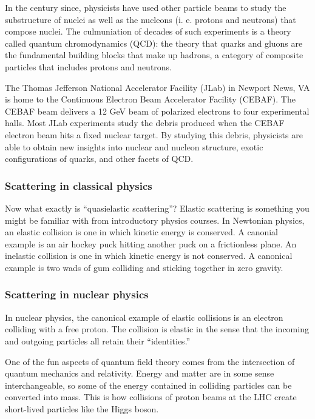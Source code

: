 In the century since, physicists have used other particle beams to study the
substructure of nuclei as well as the nucleons (i.  e.  protons and neutrons)
that compose nuclei.
The culmuniation of decades of such experiments is a theory called quantum
chromodynamics (QCD): the theory that quarks and gluons are the fundamental
building blocks that make up hadrons, a category of composite particles that
includes protons and neutrons.

The Thomas Jefferson National Accelerator Facility (JLab) in Newport News, VA
is home to the Continuous Electron Beam Accelerator Facility (CEBAF).
The CEBAF beam delivers a 12 GeV beam of polarized electrons to four
experimental halls.
Most JLab experiments study the debris produced when the CEBAF electron beam
hits a fixed nuclear target.
By studying this debris, physicists are able to obtain new insights into
nuclear and nucleon structure, exotic configurations of quarks, and other
facets of QCD.

\subsubsection{Scattering in classical physics}
Now what exactly is “quasielastic scattering”?
Elastic scattering is something you might be familiar with from introductory
physics courses.
In Newtonian physics, an elastic collision is one in which kinetic energy is
conserved.
A canonial example is an air hockey puck hitting another puck on a frictionless
plane.
An inelastic collision is one in which kinetic energy is not conserved.
A canonical example is two wads of gum colliding and sticking together in zero
gravity.

\subsubsection{Scattering in nuclear physics}
In nuclear physics, the canonical example of elastic collisions is an electron
colliding with a free proton.
The collision is elastic in the sense that the incoming and outgoing particles
all retain their “identities.”

One of the fun aspects of quantum field theory comes from the intersection of
quantum mechanics and relativity.
Energy and matter are in some sense interchangeable, so some of the energy
contained in colliding particles can be converted into mass.
This is how collisions of proton beams at the LHC create short-lived particles
like the Higgs boson.

